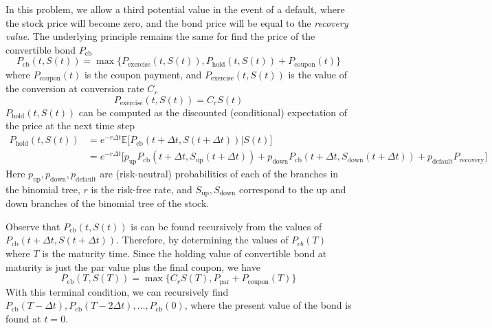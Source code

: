 \documentclass[11pt]{article}
\theoremstyle{definition}
\begin{document}
In this problem, we allow a third potential value 
in the event of a default, where the stock price 
will become zero, and the bond price will be equal to 
the \emph{recovery value}.
The underlying principle remains the same
for find the price of the convertible bond $P_\text{cb}$
%
\begin{equation}
\label{exercise}
  P_\text{cb}(t,S(t)) = \max\Big\{P_\text{exercise}(t,S(t)), 
                        P_\text{hold}(t,S(t)) + 
                        P_\text{coupon}(t)\Big\}
\end{equation}
%
where $P_\text{coupon}(t)$ is the coupon payment,
and $P_\text{exercise}(t,S(t))$ is the value of the conversion
at conversion rate $C_r$
%
\begin{equation*}
  P_\text{exercise}(t,S(t)) = C_r S(t)
\end{equation*}
%
$P_\text{hold}(t,S(t))$ can be computed as the 
discounted (conditional) expectation of 
the price at the next time step
%
\begin{equation}
\label{cond_exp}
\begin{aligned}
  P_\text{hold}(t,S(t)) &= e^{-r\Delta t} 
    \mathbb{E}\Big[P_\text{cb}(t+\Delta t,S(t+\Delta t)) \Big| S(t)\Big] \\
  &= e^{-r\Delta t} \Big[p_\text{up} 
    P_\text{cb}(t+\Delta t,S_\text{up}(t+\Delta t)) + 
    p_\text{down} P_\text{cb}(t+\Delta t,S_\text{down}(t+\Delta t)) + 
    p_\text{default} P_\text{recovery} \Big]
\end{aligned}
\end{equation}
%
Here $p_\text{up}, p_\text{down}, p_\text{default}$
are (risk-neutral) probabilities of each of the branches
in the binomial tree, $r$ is the risk-free rate,
and $S_\text{up}, S_\text{down}$ correspond to 
the up and down branches of the binomial tree of the stock.

Observe that $P_\text{cb}(t,S(t))$ is can be found recursively
from the values of $P_\text{cb}(t+\Delta t,S(t+\Delta t))$.
Therefore, by determining the values of $P_{cb}(T)$ 
where $T$ is the maturity time.
Since the holding value of convertible bond at maturity
is just the par value plus the final coupon, we have
%
\begin{equation}
\label{terminal}
  P_\text{cb}(T,S(T)) = \max\Big\{C_r S(T), P_\text{par} + 
                    P_\text{coupon}(T)\Big\}
\end{equation}
%
With this terminal condition, we can recursively find
$P_\text{cb}(T-\Delta t), P_\text{cb}(T- 2 \Delta t),
\ldots, P_\text{cb}(0)$,
where the present value of the bond is found at $t=0$.
\end{document}
